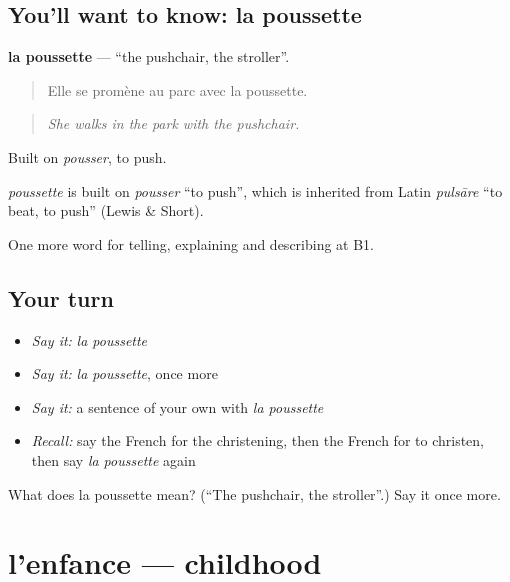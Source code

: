 \subsection*{You'll want to know: la poussette}
\textbf{la poussette} — \textquotedblleft{}the pushchair, the stroller\textquotedblright{}.

\begin{quote}
Elle se promène au parc avec la poussette.
\end{quote}

\begin{quote}
\emph{She walks in the park with the pushchair.}
\end{quote}

Built on \emph{pousser}, to push.

\begin{cousinweb}
\emph{poussette} is built on \emph{pousser} \textquotedblleft{}to push\textquotedblright{}, which is inherited from Latin \emph{pulsāre} \textquotedblleft{}to beat, to push\textquotedblright{} (Lewis \& Short).
\end{cousinweb}

\begin{grammarlens}[title={What you've built}]
One more word for telling, explaining and describing at B1.
\end{grammarlens}

\subsection*{Your turn}
\begin{itemize}
\raggedright
  \item \emph{Say it:} \emph{la poussette}
  \item \emph{Say it:} \emph{la poussette}, once more
  \item \emph{Say it:} a sentence of your own with \emph{la poussette}
  \item \emph{Recall:} say the French for the christening, then the French for to christen, then say \emph{la poussette} again
\end{itemize}

\begin{tcolorbox}[breakable,colback=teal!4,colframe=teal!35!black,title={Before you move on}]
What does la poussette mean? (\textquotedblleft{}The pushchair, the stroller\textquotedblright{}.) Say it once more.
\end{tcolorbox}
\section[l'enfance]{l'enfance — childhood}

